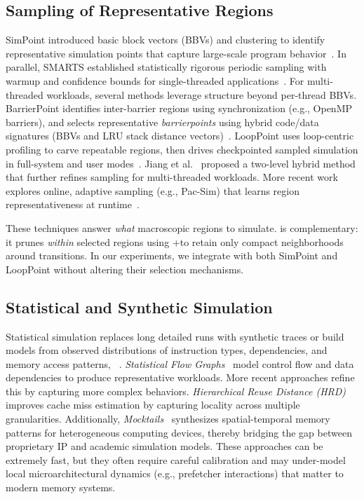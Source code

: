 \subsection{Sampling of Representative Regions}
SimPoint introduced basic block vectors (BBVs) and clustering to identify representative simulation points that capture large-scale program behavior~\cite{simpoint-asplos02}. In parallel, SMARTS established statistically rigorous periodic sampling with warmup and confidence bounds for single-threaded applications~\cite{SMARTS1}. For multi-threaded workloads, several methods leverage structure beyond per-thread BBVs. BarrierPoint identifies inter-barrier regions using synchronization (e.g., OpenMP barriers), and selects representative \emph{barrierpoints} using hybrid code/data signatures (BBVs and LRU stack distance vectors)~\cite{barrierpoint}. LoopPoint uses loop-centric profiling to carve repeatable regions, then drives checkpointed sampled simulation in full-system and user modes~\cite{looppoint}. Jiang et al.~\cite{jiang2015_taco} proposed a two-level hybrid method that further refines sampling for multi-threaded workloads. More recent work explores online, adaptive sampling (e.g., Pac-Sim) that learns region representativeness at runtime~\cite{pacsimm-taco24}. 
 
These techniques answer \emph{what} macroscopic regions to simulate. \name is complementary: it prunes \emph{within} selected regions using \pts+\cpd to retain only compact neighborhoods around transitions.
In our experiments, we integrate with both SimPoint and LoopPoint without altering their selection mechanisms.

\subsection{Statistical and Synthetic Simulation}
Statistical simulation replaces long detailed runs with synthetic traces or build models from observed distributions of instruction types, dependencies, and memory access patterns, ~\cite{Nussbaum2009StatisticalSB}. \emph{Statistical Flow Graphs}~\cite{wunderlich2003smarts} model control flow and data dependencies to produce representative workloads. {More recent approaches refine this by capturing more complex behaviors}. \emph{Hierarchical Reuse Distance (HRD)}~\cite{hrd} improves cache miss estimation by capturing locality across multiple granularities. Additionally, \emph{Mocktails}~\cite{mocktails} synthesizes spatial-temporal memory patterns for heterogeneous computing devices, thereby bridging the gap between proprietary IP and academic simulation models.  These approaches can be extremely fast, but they often require careful calibration and may under-model local microarchitectural dynamics (e.g., prefetcher  interactions) that matter to modern memory systems.  

